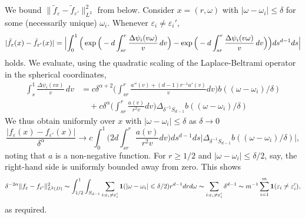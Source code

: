 \documentclass{article}
\numberwithin{equation}{section}
\theoremstyle{definition}
\providecommand{\eps}{\varepsilon}
\providecommand{\abs}[1]{\lvert #1 \rvert}
\providecommand{\norm}[1]{\lVert #1 \rVert}
\providecommand{\babs}[1]{{\Bigl\lvert #1 \Bigr\rvert}}
\renewcommand{\le}{\leqslant}
\renewcommand{\ge}{\geqslant}
\begin{document}
We bound $\norm{\tilde f_\eps-\tilde f_{\eps'}}_{L^2}^2$ from below. Consider $x=(r,\omega)$ with $\abs{\omega-\omega_i}\le\delta$ for some (necessarily unique) $\omega_i$. Whenever $\eps_i\not=\eps_i'$,
\[ \abs{\tilde f_\eps(x)-\tilde f_{\eps'}(x)}=\babs{\int_0^1 \Big(\exp\Big(-d\int_{sr}^r \frac{\Delta \psi_i(v\omega)}{v}\, dv\Big)-\exp\Big(-d\int_{sr}^r \frac{\Delta \psi_i(v\omega)}{v}\, dv\Big)\Big)ds^{d-1} ds}
\]
holds. We evaluate, using the quadratic scaling of the Laplace-Beltrami operator in the spherical coordinates,
\begin{align*}
\int_{s}^1 \frac{\Delta \psi_i(vx)}{v}\, dv &=c\delta^{\alpha+2}\Big(\int_{sr}^r \frac{a''(v)+(d-1)r^{-1}a'(v)}{v}dv\Big)b((\omega-\omega_i)/\delta)\\
&\quad +c\delta^\alpha\Big(\int_{sr}^r \frac{a(v)}{r^2v}dv\Big)\Delta_{\delta^{-1}S_{d-1}}b((\omega-\omega_i)/\delta)
\end{align*}
We thus obtain uniformly over $x$ with $\abs{\omega-\omega_i}\le\delta$ as $\delta\to 0$
\[ \frac{\abs{f_\eps(x)-f_{\eps'}(x)}}{\delta^\alpha}\to c\int_0^1 \Big(2d\int_{sr}^r \frac{a(v)}{r^2v}dv\Big)ds^{d-1} ds\abs{\Delta_{\delta^{-1}S_{d-1}} b((\omega-\omega_i)/\delta)},
\]
noting that $a$ is a non-negative function. For $r\ge 1/2$ and $\abs{\omega-\omega_i}\le\delta/2$, say, the right-hand side is uniformly bounded away from zero. This shows
\[ \delta^{-2\alpha}\norm{f_\eps-f_{\eps'}}_{L^2(D)}^2\thicksim \int_{1/2}^1\int_{S_{d-1}}\sum_{i:\eps_i\not=\eps_i'}{\bf 1}(\abs{\omega-\omega_i}\le\delta/2)r^{d-1}drd\omega\thicksim  \sum_{i:\eps_i\not=\eps_i'}\delta^{d-1}\thicksim m^{-1}\sum_{i=1}^m{\bf 1}(\eps_i\not=\eps_i'),
\]
as required.
\end{document}
